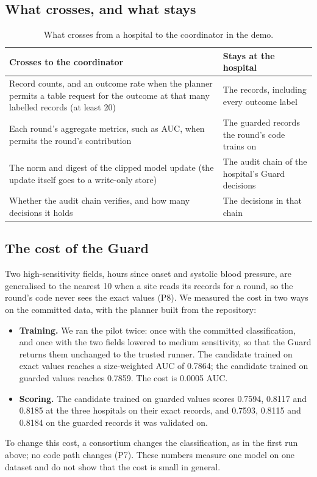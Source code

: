 \subsection{What crosses, and what stays}

\begin{table}[h]
\centering
\small
\begin{tabularx}{\linewidth}{@{}Y Y@{}}
\toprule
Crosses to the coordinator & Stays at the hospital \\
\midrule
Record counts, and an outcome rate when the planner permits a table request
for the outcome at that many labelled records (at least 20) & The records,
including every outcome label \\
Each round's aggregate metrics, such as AUC, when  permits
the round's contribution & The guarded records the round's code trains on \\
The norm and digest of the clipped model update (the update itself goes to a
write-only store) & The audit chain of the hospital's Guard decisions \\
Whether the audit chain verifies, and how many decisions it holds & The
decisions in that chain \\
\bottomrule
\end{tabularx}
\caption{What crosses from a hospital to the coordinator in the demo.}
\label{tab:crosses}
\end{table}

\subsection{The cost of the Guard}
\label{sec:cost}

Two high-sensitivity fields, hours since onset and systolic blood pressure, are
generalised to the nearest 10 when a site reads its records for a round, so the
round's code never sees the exact values (P8). We measured the cost in two ways
on the committed data, with the planner built from the repository:
\begin{itemize}
  \item \textbf{Training.} We ran the pilot twice: once with the committed
        classification, and once with the two fields lowered to medium
        sensitivity, so that the Guard returns them unchanged to the trusted
        runner. The candidate trained on exact values reaches a size-weighted
        AUC of 0.7864; the candidate trained on guarded values reaches 0.7859.
        The cost is 0.0005 AUC.
  \item \textbf{Scoring.} The candidate trained on guarded values scores 0.7594,
        0.8117 and 0.8185 at the three hospitals on their exact records, and
        0.7593, 0.8115 and 0.8184 on the guarded records it was validated on.
\end{itemize}
To change this cost, a consortium changes the classification, as in the first
run above; no code path changes (P7). These numbers measure one model on one
dataset and do not show that the cost is small in general.

